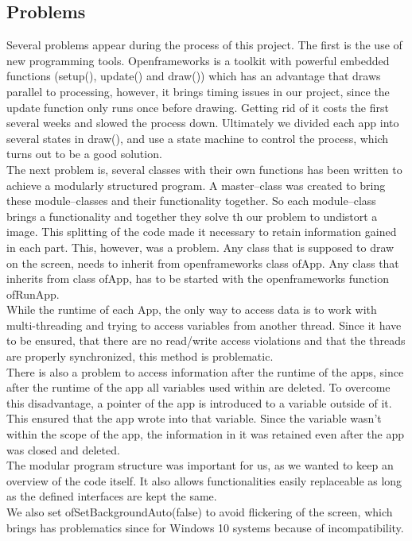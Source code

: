 \documentclass[journal,final,a4paper,twoside]{PS}
\begin{document}
\subsection{Problems}
\label{sec:probs}
Several problems appear during the process of this project.
The first is the use of new programming tools. Openframeworks is a toolkit with powerful embedded functions (setup(), update() and draw()) which has an advantage that draws parallel to processing, however, it brings timing issues in our project, since the update function only runs once before drawing. Getting rid of it costs the first several weeks and slowed the process down. Ultimately we divided each app into several states in draw(), and use a state machine to control the process, which turns out to be a good solution.  \\
The next problem is, several classes with their own functions has been written to achieve a modularly structured program. A  master--class was created to bring these module--classes and their functionality together. So each module--class brings a functionality and together they solve th our problem to undistort a image. This splitting of the code made it necessary to retain information gained in each part. This, however, was a problem. Any class that is supposed to draw on the screen, needs to inherit from openframeworks class ofApp. Any class that inherits from class ofApp, has to be started with the openframeworks function ofRunApp.\\
While the runtime of each App, the only way to access data is to work with multi-threading and trying to access variables from another thread. Since it have to be ensured, that there are no read/write access violations and that the threads are properly synchronized, this method is problematic. \\
There is also a problem to access information after the runtime of the apps, since after the runtime of the app all variables used within are deleted. To overcome this disadvantage, a pointer of the app is introduced to a variable outside of it. This ensured that the app wrote into that variable. Since the variable wasn't within the scope of the app, the information in it was retained even after the app was closed and deleted.\\
The modular program structure was important for us, as we wanted to keep an overview of the code itself. It also allows functionalities easily replaceable as long as the defined interfaces are kept the same.
\\
We also set ofSetBackgroundAuto(false) to avoid flickering of the screen, which brings has problematics since for Windows 10 systems because of incompatibility. 
\end{document}
